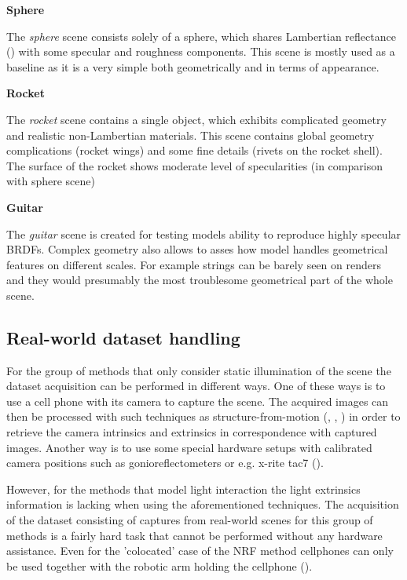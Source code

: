 \textbf{Sphere}

The \textit{sphere} scene consists solely of a sphere,
which shares Lambertian reflectance (\cite{blinn1982light}) with some specular and roughness components.
This scene is mostly used as a baseline as it is a very simple
both geometrically and in terms of appearance.

\textbf{Rocket}

The \textit{rocket} scene contains a single object,
which exhibits complicated geometry and realistic non-Lambertian materials.
This scene contains global geometry complications (rocket wings) and some fine details (rivets on the rocket shell).
The surface of the rocket shows moderate level of specularities (in comparison with sphere scene)

\textbf{Guitar}

The \textit{guitar} scene is created for testing models ability
to reproduce highly specular BRDFs.
Complex geometry also allows to asses how model handles geometrical features on different scales.
For example strings can be barely seen on renders and they would presumably the most troublesome geometrical part of the whole scene.



\subsection{Real-world dataset handling}

For the group of methods that only consider static illumination of the scene
the dataset acquisition can be performed in different ways.
One of these ways is to use a cell phone with its camera to capture the scene.
The acquired images can then be processed with such techniques as
structure-from-motion (\cite{Moulon2012}, \cite{Jancosek2011}, \cite{schoenberger2016structure})
in order to retrieve the camera intrinsics and extrinsics in correspondence with captured images.
Another way is to use some special hardware setups with calibrated camera positions
such as gonioreflectometers or e.g. x-rite tac7 (\cite{merzbach2017highquality}).

However, for the methods that model light interaction the light extrinsics information is lacking
when using the aforementioned techniques.
The acquisition of the dataset consisting of captures from real-world scenes
for this group of methods is a fairly hard task that cannot be performed without any hardware assistance.
Even for the 'colocated' case of the NRF method cellphones can only be used
together with the robotic arm holding the cellphone (\cite{bi2020neural}).

